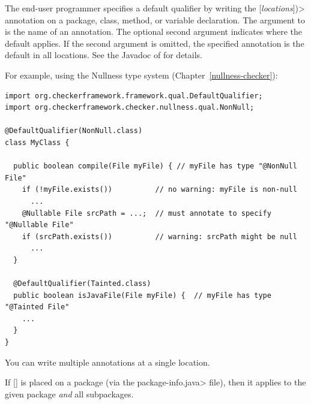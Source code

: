 The end-user programmer specifies a default qualifier by writing the
[\emph{locations}]\<)>
annotation on a package, class, method, or variable declaration.  The
argument to  is the 
name of an annotation.
The optional second argument indicates where the default
applies.  If the second argument is omitted, the specified annotation is
the default in all locations.  See the Javadoc of  for details.

For example, using the Nullness type system (Chapter~\ref{nullness-checker}):

\begin{Verbatim}
import org.checkerframework.framework.qual.DefaultQualifier;
import org.checkerframework.checker.nullness.qual.NonNull;

@DefaultQualifier(NonNull.class)
class MyClass {

  public boolean compile(File myFile) { // myFile has type "@NonNull File"
    if (!myFile.exists())          // no warning: myFile is non-null
      ...
    @Nullable File srcPath = ...;  // must annotate to specify "@Nullable File"
    if (srcPath.exists())          // warning: srcPath might be null
      ...
  }

  @DefaultQualifier(Tainted.class)
  public boolean isJavaFile(File myFile) {  // myFile has type "@Tainted File"
    ...
  }
}
\end{Verbatim}

You can write multiple
 annotations at a single location.

If [] is placed on a package (via the
\<package-info.java> file), then it applies to the given package \emph{and}
all subpackages.






